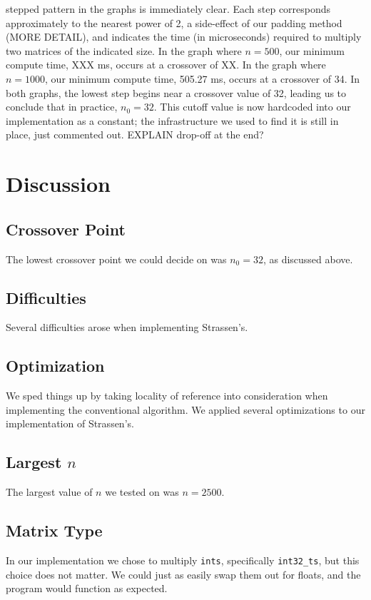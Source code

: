 \documentclass[solution, letterpaper]{cs121}
\begin{document}
stepped pattern in the graphs is immediately clear. Each step corresponds approximately to the nearest power of 2, a side-effect of our padding method (MORE DETAIL), and indicates the time (in microseconds) required to multiply two matrices of the indicated size. In the graph where $n=500$, our minimum compute time, XXX ms, occurs at a crossover of XX. In the graph where $n=1000$, our minimum compute time, 505.27 ms, occurs at a crossover of 34. In both graphs, the lowest step begins near a crossover value of 32, leading us to conclude that in practice, $n_0 = 32$. This cutoff value is now hardcoded into our implementation as a constant; the infrastructure we used to find it is still in place, just commented out. EXPLAIN drop-off at the end?

\section*{Discussion}

\subsection*{Crossover Point}
The lowest crossover point we could decide on was $n_0 = 32$, as discussed above.

\subsection*{Difficulties}
Several difficulties arose when implementing Strassen's.

\subsection*{Optimization}
We sped things up by taking locality of reference into consideration when implementing the conventional algorithm. We applied several optimizations to our implementation of Strassen's.

\subsection*{Largest $n$}
The largest value of $n$ we tested on was $n = 2500$. 

\subsection*{Matrix Type}
In our implementation we chose to multiply {\tt ints}, specifically {\tt int32\_ts}, but this choice does not matter. We could just as easily swap them out for floats, and the program would function as expected.
\end{document}
